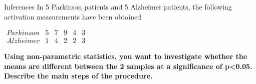 \documentclass{beamer}
\begin{document}
\begin{frame}{Inferences}
  In 5 Parkinson patients and 5 Alzheimer patients, the following activation measurements have been obtained

  \smallskip

  $
  \begin{array}{cccccc}
    Parkinson &5 &7 &9 &4 &3\\
    Alzheimer &1 &4 &2 &2 &3
  \end{array}
  $

  \smallskip

  \textbf{Using non-parametric statistics, you want to investigate whether the means are different between the 2 samples at a significance of p<0.05. Describe the main steps of the procedure.}

\end{frame}
\end{document}
